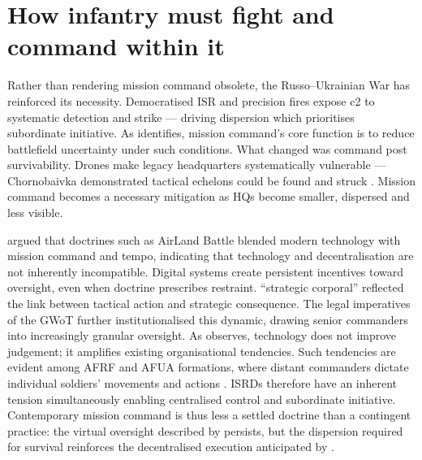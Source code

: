 \chapter{How infantry must fight and command within it} 

Rather than rendering mission command obsolete, the Russo--Ukrainian War has reinforced its necessity. Democratised ISR and precision fires expose \gls{c2} to systematic detection and strike --- driving dispersion which prioritises subordinate initiative. As \textcite[208]{busby_2025_military_command_change_21st_century} identifies, mission command's core function is to reduce battlefield uncertainty under such conditions.
What changed was command post survivability. Drones make legacy headquarters systematically vulnerable --- Chornobaivka demonstrated tactical echelons could be found and struck \parencite{beagle_slider_arrol_2023_graveyard_command_posts}. Mission command becomes a necessary mitigation as HQs become smaller, dispersed and less visible.


\textcite{METZ_2000} argued that doctrines such as AirLand Battle blended modern technology with mission command and tempo, indicating that technology and decentralisation are not inherently incompatible. Digital systems create persistent incentives toward oversight, even when doctrine prescribes restraint.  ``strategic corporal'' reflected the link between tactical action and strategic consequence. The legal imperatives of the \gls{GWoT} further institutionalised this dynamic, drawing senior commanders into increasingly granular oversight. As \textcite{BETTS_1996} observes, technology does not improve judgement; it amplifies existing organisational tendencies. Such tendencies are evident among AFRF and AFUA formations, where distant commanders dictate individual soldiers' movements and actions \parencite{dan_participant_1}. ISRDs therefore have an inherent tension simultaneously enabling centralised control and subordinate initiative. Contemporary mission command is thus less a settled doctrine than a contingent practice: the virtual oversight described by \textcite{COHEN_1996} persists, but the dispersion required for survival reinforces the decentralised execution anticipated by \textcite[15]{USMC_MOC_2016}.

